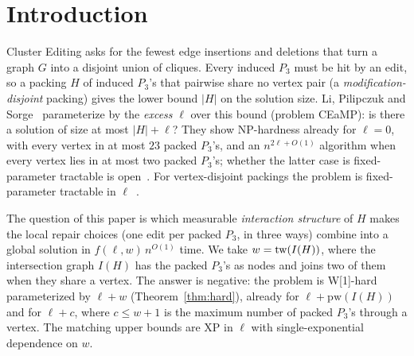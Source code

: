 \section{Introduction}
Cluster Editing asks for the fewest edge insertions and deletions that turn a graph $G$ into a disjoint union of cliques.
Every induced $P_3$ must be hit by an edit, so a packing $H$ of induced $P_3$'s that pairwise share no vertex pair (a \emph{modification-disjoint} packing) gives the lower bound $|H|$ on the solution size.
Li, Pilipczuk and Sorge~\cite{LPS23} parameterize by the \emph{excess} $\ell$ over this bound (problem CEaMP): is there a solution of size at most $|H|+\ell$?
They show NP-hardness already for $\ell=0$, with every vertex in at most $23$ packed $P_3$'s, and an $n^{2\ell+O(1)}$ algorithm when every vertex lies in at most two packed $P_3$'s; whether the latter case is fixed-parameter tractable is open~\cite{LPS23}.
For vertex-disjoint packings the problem is fixed-parameter tractable in $\ell$~\cite{BFK18}.

The question of this paper is which measurable \emph{interaction structure} of $H$ makes the local repair choices (one edit per packed $P_3$, in three ways) combine into a global solution in $f(\ell,w)\,n^{O(1)}$ time.
We take $w=\mathrm{tw}(I(H))$, where the intersection graph $I(H)$ has the packed $P_3$'s as nodes and joins two of them when they share a vertex. The answer is negative: the problem is W[1]-hard parameterized by $\ell+w$ (Theorem~\ref{thm:hard}), already for $\ell+\mathrm{pw}(I(H))$ and for $\ell+c$, where $c\le w+1$ is the maximum number of packed $P_3$'s through a vertex. The matching upper bounds are XP in $\ell$ with single-exponential dependence on $w$.

